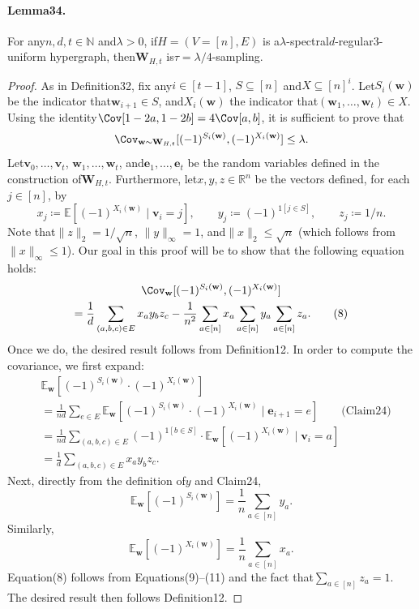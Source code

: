 \paragraph{Lemma34.} For any$n,d,t\in\mathbb N$ and$\lambda>0$, if$H=(V=[n],E)$ is a$\lambda$-spectral$d$-regular3-uniform hypergraph, then$\mathbf W_{H,t}$ is$\tau=\lambda/4$-sampling.
\begin{proof}
As in Definition32, fix any$i\in[t-1]$, $S\subseteq[n]$ and$X\subseteq[n]^i$. Let$S_i(\mathbf w)$ be the indicator that$\mathbf w_{i+1}\in S$, and$X_i(\mathbf w)$ the indicator that$(\mathbf w_1,\ldots,\mathbf w_t)\in X$. Using the identity$\Cov[1-2a,1-2b]=4\Cov[a,b]$, it is sufficient to prove that
\[\Cov_{\mathbf w\sim\mathbf W_{H,t}}[(-1)^{S_i(\mathbf w)},(-1)^{X_i(\mathbf w)}]\leq\lambda.\]
Let$\mathbf v_0,\ldots,\mathbf v_t$, $\mathbf w_1,\ldots,\mathbf w_t$, and$\mathbf e_1,\ldots,\mathbf e_t$ be the random variables defined in the construction of$\mathbf W_{H,t}$. Furthermore, let$x,y,z\in\mathbb R^n$ be the vectors defined, for each$j\in[n]$, by
\[x_j\coloneqq\mathbb E[(-1)^{X_i(\mathbf w)}\mid\mathbf v_i=j],\qquad y_j\coloneqq(-1)^{1[j\in S]},\qquad z_j\coloneqq1/n.\]
Note that$\|z\|_2=1/\sqrt n$, $\|y\|_{\infty}=1$, and$\|x\|_2\leq\sqrt n$ (which follows from$\|x\|_{\infty}\leq1$). Our goal in this proof will be to show that the following equation holds:
\begin{multline*}
\Cov_{\mathbf w}[(-1)^{S_i(\mathbf w)},(-1)^{X_i(\mathbf w)}]\\
=\frac1d\sum_{(a,b,c)\in E}x_ay_bz_c-\frac1{n^2}\sum_{a\in[n]}x_a\sum_{a\in[n]}y_a\sum_{a\in[n]}z_a.\tag{8}
\end{multline*}
Once we do, the desired result follows from Definition12. In order to compute the covariance, we first expand:
\begin{align*}
&\mathbb E_{\mathbf w}[(-1)^{S_i(\mathbf w)}\cdot(-1)^{X_i(\mathbf w)}]\\
&=\frac1{nd}\sum_{e\in E}\mathbb E_{\mathbf w}[(-1)^{S_i(\mathbf w)}\cdot(-1)^{X_i(\mathbf w)}\mid\mathbf e_{i+1}=e]\qquad\text{(Claim24)}\\
&=\frac1{nd}\sum_{(a,b,c)\in E}(-1)^{1[b\in S]}\cdot\mathbb E_{\mathbf w}[(-1)^{X_i(\mathbf w)}\mid\mathbf v_i=a]\\
&=\frac1d\sum_{(a,b,c)\in E}x_ay_bz_c.\tag{9}
\end{align*}
Next, directly from the definition of$y$ and Claim24,
\[\mathbb E_{\mathbf w}[(-1)^{S_i(\mathbf w)}]=\frac1n\sum_{a\in[n]}y_a.\tag{10}\]
Similarly,
\[\mathbb E_{\mathbf w}[(-1)^{X_i(\mathbf w)}]=\frac1n\sum_{a\in[n]}x_a.\tag{11}\]
Equation(8) follows from Equations(9)–(11) and the fact that$\sum_{a\in[n]}z_a=1$. The desired result then follows Definition12.
\end{proof}
